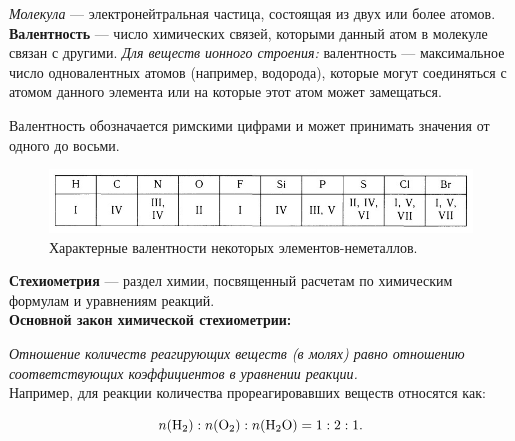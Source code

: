\textit{Молекула} --- электронейтральная частица, состоящая из двух или более атомов.\\

\textbf{Валентность} --- число химических связей, которыми данный атом в молекуле связан с другими. \textit{Для веществ ионного строения:} валентность --- максимальное число одновалентных атомов (например, водорода), которые могут соединяться с атомом данного элемента или на которые этот атом может замещаться.

Валентность обозначается римскими цифрами и может принимать значения от одного до восьми. 

\begin{figure}[H]
	\centering
	\includegraphics{Pictures/Val.jpg}
	\caption{Характерные валентности некоторых элементов-неметаллов.}
\end{figure}

\textbf{Стехиометрия} --- раздел химии, посвященный расчетам по химическим формулам и уравнениям реакций.\\

\textbf{Основной закон химической стехиометрии:}

\emph{Отношение количеств реагирующих веществ (в молях) равно отношению соответствующих коэффициентов в уравнении реакции.}\\

Например, для реакции  количества прореагировавших веществ относятся как:

\begin{equation*}
n(\ce{H2}): n(\ce{O2}): n(\ce{H2O}) = 1:2:1.
\end{equation*}
